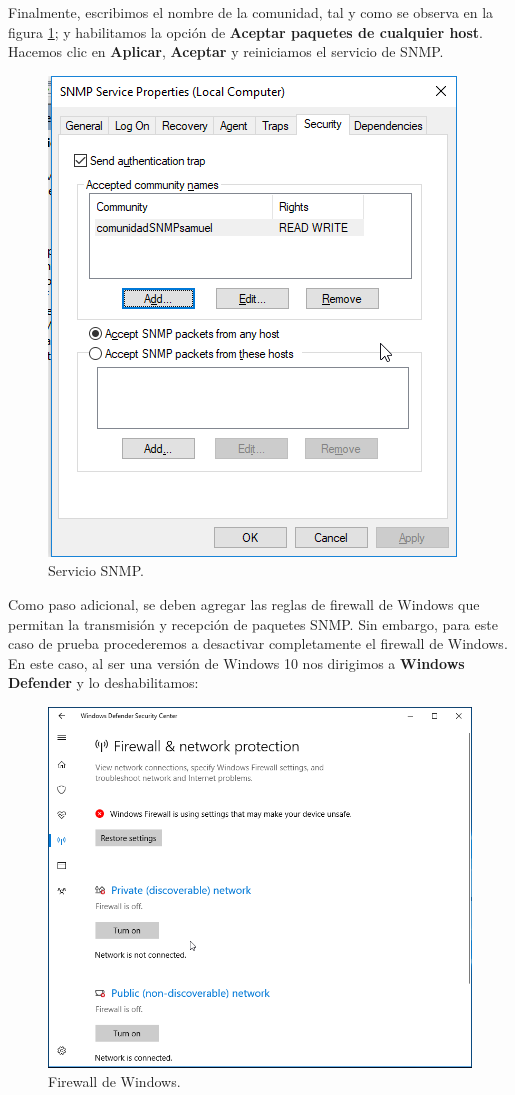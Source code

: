 Finalmente, escribimos el nombre de la comunidad, tal y como se observa en la figura \ref{image:paquetes}; y habilitamos la opción de \textbf{Aceptar paquetes de cualquier host}. Hacemos clic en \textbf{Aplicar}, \textbf{Aceptar} y reiniciamos el servicio de SNMP.

\FloatBarrier
\begin{figure}[htbp!]
		\centering
			\includegraphics[width=.4 \textwidth]{images/paquetes}
		\caption{Servicio SNMP.}
		\label{image:paquetes}
\end{figure}
\FloatBarrier

Como paso adicional, se deben agregar las reglas de firewall de Windows que permitan la transmisión y recepción de paquetes SNMP. Sin embargo, para este caso de prueba procederemos a desactivar completamente el firewall de Windows. En este caso, al ser una versión de Windows 10 nos dirigimos a \textbf{Windows Defender} y lo deshabilitamos:

\FloatBarrier
\begin{figure}[htbp!]
		\centering
			\includegraphics[width=.7 \textwidth]{images/firewall}
		\caption{Firewall de Windows.}
		\label{image:firewall}
\end{figure}
\FloatBarrier